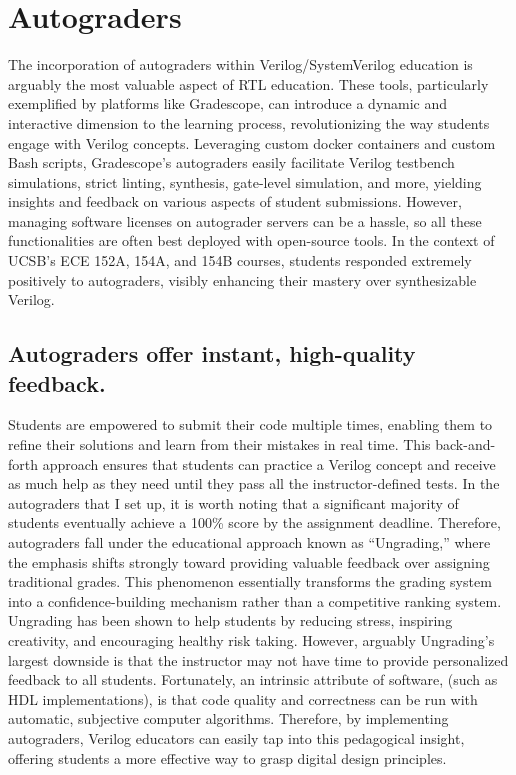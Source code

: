 
\chapter{Autograders}
\label{chapter:autograders}

The incorporation of autograders within Verilog/SystemVerilog education is arguably the most valuable aspect of RTL education. These tools, particularly exemplified by platforms like Gradescope, can introduce a dynamic and interactive dimension to the learning process, revolutionizing the way students engage with Verilog concepts. Leveraging custom docker containers and custom Bash scripts, Gradescope's autograders easily facilitate Verilog testbench simulations, strict linting, synthesis, gate-level simulation, and more, yielding insights and feedback on various aspects of student submissions. However, managing software licenses on autograder servers can be a hassle, so all these functionalities are often best deployed with open-source tools. In the context of UCSB's ECE 152A, 154A, and 154B courses, students responded extremely positively to autograders, visibly enhancing their mastery over synthesizable Verilog.

\section{Autograders offer instant, high-quality feedback.}

Students are empowered to submit their code multiple times, enabling them to refine their solutions and learn from their mistakes in real time. This back-and-forth approach ensures that students can practice a Verilog concept and receive as much help as they need until they pass all the instructor-defined tests. In the autograders that I set up, it is worth noting that a significant majority of students eventually achieve a 100\% score by the assignment deadline. Therefore, autograders fall under the educational approach known as \enquote{Ungrading,} where the emphasis shifts strongly toward providing valuable feedback over assigning traditional grades. This phenomenon essentially transforms the grading system into a confidence-building mechanism rather than a competitive ranking system. Ungrading has been shown to help students by reducing stress, inspiring creativity, and encouraging healthy risk taking. \cite{kohn:book, blum:article} However, arguably Ungrading's largest downside is that the instructor may not have time to provide personalized feedback to all students. Fortunately, an intrinsic attribute of software, (such as HDL implementations), is that code quality and correctness can be run with automatic, subjective computer algorithms. Therefore, by implementing autograders, Verilog educators can easily tap into this pedagogical insight, offering students a more effective way to grasp digital design principles.

